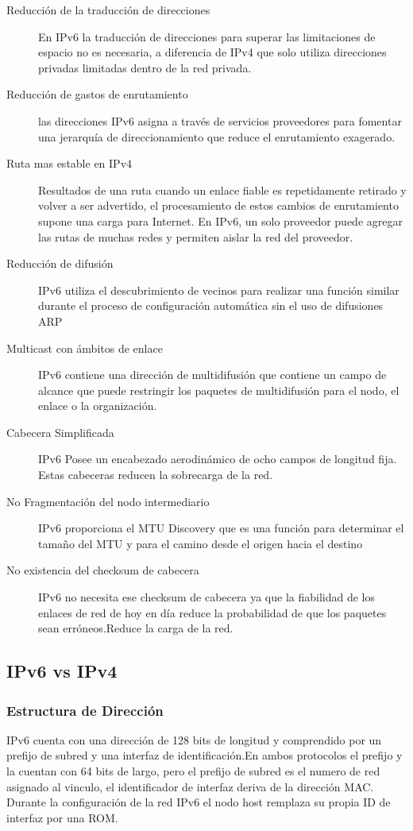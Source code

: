 \documentclass[11pt,a4paper]{article}
\begin{document}
\begin{description}
\item[Reducción de la traducción de direcciones] En IPv6 la traducción de direcciones para superar 
las limitaciones de espacio no es necesaria, a diferencia de IPv4 que solo utiliza direcciones 
privadas limitadas dentro de la red privada.
\item[Reducción de gastos de enrutamiento] las direcciones IPv6 asigna a través de servicios 
proveedores para fomentar una jerarquía de direccionamiento que reduce el enrutamiento exagerado.
\item[Ruta mas estable en IPv4]Resultados de una ruta cuando un enlace fiable es repetidamente 
retirado y volver a ser advertido, el procesamiento de estos cambios de enrutamiento supone una 
carga para Internet. En IPv6, un solo proveedor puede agregar las rutas de muchas redes y permiten 
aislar la red del proveedor.
\item[Reducción de difusión] IPv6  utiliza el descubrimiento de vecinos para realizar una función 
similar durante el proceso de configuración automática sin el uso de difusiones ARP
\item[Multicast con ámbitos de enlace] IPv6 contiene una dirección de multidifusión que contiene un 
campo de alcance que puede restringir los paquetes de multidifusión para el nodo, el enlace o la 
organización.
\item [Cabecera Simplificada] IPv6 Posee un encabezado aerodinámico de ocho campos de longitud 
fija. Estas cabeceras reducen la sobrecarga de la red.
\item[No Fragmentación del nodo intermediario]IPv6 proporciona el MTU Discovery que es una función 
para determinar el tamaño del MTU y para el camino desde el origen hacia el destino
\item[No existencia del checksum de cabecera]IPv6 no necesita ese checksum de cabecera ya que la 
fiabilidad de los enlaces de red de hoy en día reduce la probabilidad de que los paquetes sean 
erróneos.Reduce la carga de la red.
\end{description}

\subsection{IPv6 vs IPv4}
\subsubsection{Estructura de Dirección}
IPv6 cuenta con una dirección de 128 bits de longitud y comprendido por un prefijo de subred y una 
interfaz de identificación.En ambos protocolos el prefijo y la cuentan con 64 bits de largo, pero el 
prefijo de subred es el numero de red asignado al vinculo, el identificador de interfaz deriva de la 
dirección MAC. Durante la configuración de la red IPv6 el nodo host remplaza su propia ID de 
interfaz por una ROM.
\end{document}
